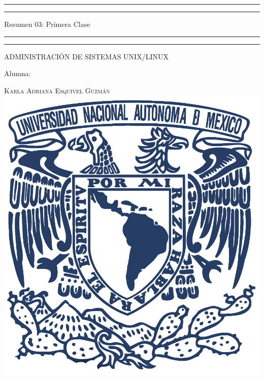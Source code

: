 \documentclass[a4paper, 11pt, oneside]{article}
\begin{document}
 

\begin{titlepage} 

	\centering 
	
	\scshape 
	
	\vspace*{\baselineskip} 
	
	
	
	\rule{\textwidth}{1.6pt}\vspace*{-\baselineskip}\vspace*{2pt} 
	\rule{\textwidth}{0.4pt} 
	
	\vspace{0.75\baselineskip} 
	
	{\LARGE Resumen 03: Primera Clase}	
	\vspace{0.75\baselineskip} 
	
	\rule{\textwidth}{0.4pt}\vspace*{-\baselineskip}\vspace{3.2pt}
	\rule{\textwidth}{1.6pt} 
	
	\vspace{2\baselineskip} 
	

	ADMINISTRACIÓN DE SISTEMAS UNIX/LINUX
	
	\vspace*{3\baselineskip} 
	
	
	
	Alumna:
	
	\vspace{0.5\baselineskip} 
	
	{\scshape\Large Karla Adriana Esquivel Guzmán \\} 
	\vspace{0.5\baselineskip} 
	\vfill
	\includegraphics{unam.jpg}
	

\end{titlepage}
\end{document}
